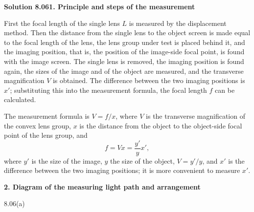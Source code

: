 \textbf{Solution 8.06}\quad \textbf{1. Principle and steps of the measurement}

First the focal length of the single lens $L$ is measured by the displacement method. Then the distance from the single lens to the object screen is made equal to the focal length of the lens, the lens group under test is placed behind it, and the imaging position, that is, the position of the image-side focal point, is found with the image screen. The single lens is removed, the imaging position is found again, the sizes of the image and of the object are measured, and the transverse magnification $V$ is obtained. The difference between the two imaging positions is $x'$; substituting this into the measurement formula, the focal length $f$ can be calculated.

The measurement formula is $V=f/x$, where $V$ is the transverse magnification of the convex lens group, $x$ is the distance from the object to the object-side focal point of the lens group, and
\[
f=Vx=\frac{y'}{y}x',
\]
where $y'$ is the size of the image, $y$ the size of the object, $V=y'/y$, and $x'$ is the difference between the two imaging positions; it is more convenient to measure $x'$.

\textbf{2. Diagram of the measuring light path and arrangement}

\begin{figbox}{8.06(a)}
\end{figbox}

